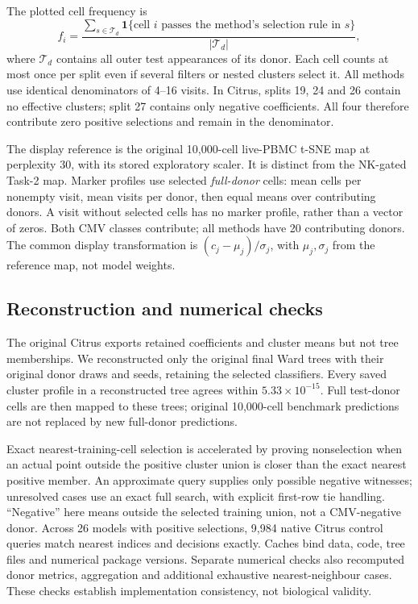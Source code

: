 \documentclass[11pt,a4paper]{article}
\begin{document}
The plotted cell frequency is
\[
f_i=\frac{\sum_{s\in\mathcal T_d}\mathbf1\{\text{cell }i\text{ passes the method's selection rule in }s\}}
{|\mathcal T_d|},
\]
where $\mathcal T_d$ contains all outer test appearances of its donor. Each cell counts at most once per split even if several filters or nested clusters select it. All methods use identical denominators of 4--16 visits. In Citrus, splits 19, 24 and 26 contain no effective clusters; split 27 contains only negative coefficients. All four therefore contribute zero positive selections and remain in the denominator.

The display reference is the original 10,000-cell live-PBMC t-SNE map at perplexity 30, with its stored exploratory scaler. It is distinct from the NK-gated Task-2 map. Marker profiles use selected \emph{full-donor} cells: mean cells per nonempty visit, mean visits per donor, then equal means over contributing donors. A visit without selected cells has no marker profile, rather than a vector of zeros. Both CMV classes contribute; all methods have 20 contributing donors. The common display transformation is $(c_j-\mu_j)/\sigma_j$, with $\mu_j,\sigma_j$ from the reference map, not model weights.

\subsection{Reconstruction and numerical checks}
The original Citrus exports retained coefficients and cluster means but not tree memberships. We reconstructed only the original final Ward trees with their original donor draws and seeds, retaining the selected classifiers. Every saved cluster profile in a reconstructed tree agrees within $5.33\times10^{-15}$. Full test-donor cells are then mapped to these trees; original 10,000-cell benchmark predictions are not replaced by new full-donor predictions.

Exact nearest-training-cell selection is accelerated by proving nonselection when an actual point outside the positive cluster union is closer than the exact nearest positive member. An approximate query supplies only possible negative witnesses; unresolved cases use an exact full search, with explicit first-row tie handling. ``Negative'' here means outside the selected training union, not a CMV-negative donor. Across 26 models with positive selections, 9,984 native Citrus control queries match nearest indices and decisions exactly. Caches bind data, code, tree files and numerical package versions. Separate numerical checks also recomputed donor metrics, aggregation and additional exhaustive nearest-neighbour cases. These checks establish implementation consistency, not biological validity.
\end{document}
